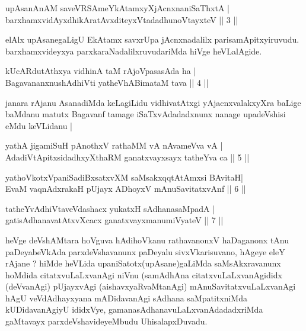 \begin{shl}
upAsanAnAM saveVRSAmeYkAtamxyXjAcnxnaniSaThxtA |\\
barxhamxvidAyxdhikAratAvxditeyxVtadadhunoVtayxteV \hfill || 3 || 
\end{shl}

\begin{artha}
elAlx upAsanegaLigU EkAtamx savxrUpa jAcnxnadalilx parisamApitxyiruvudu. barxhamxvideyxya parxkaraNadalilxruvudariMda hiVge heVLalAgide.
\end{artha}

\begin{shl}
kUcARdutAthxya vidhinA taM rAjoVpasasAda ha |\\
BagavananxnushAdhiVti yatheVhABimataM tava \hfill || 4 || 
\end{shl}

\begin{artha}
janara rAjanu AsanadiMda keLagiLidu vidhivatAtxgi yAjacnxvalakxyXra baLige baMdanu matutx Bagavanf tamage iSaTxvAdadadxnunx nanage upadeVshisi eMdu keVLidanu |
\end{artha}


\begin{shl}
yathA jigamiSuH pAnothxV rathaMM vA nAvameVva vA |\\
AdadiVtA\s \s pitxsidadhxyXthaRM ganatxvayxsayx tatheYva ca \hfill || 5 || 
\end{shl}

\begin{shl}
yathoVkotxVpaniSadiBxsatxvXM saMsakxqqtAtAmx\s si BAvitaH|\\
EvaM vaqnAdxrakaH pUjayx ADhoyxV mAnuSavitatxvAnf \hfill || 6 || 
\end{shl}

\begin{shl}
tatheYvAdhiVtaveVdashacx yukatxH sAdhanasaMpadA |\\
gatisAdhanavatAtxvXcacx ganatxvayxmanumiVyateV \hfill || 7 || 
\end{shl}

\begin{artha}
heVge deVshAMtara hoVguva hAdihoVkanu rathavanonxV haDaganonx tAnu paDeyabeVkAda parxdeVshavanunx paDeyalu sivxVkarisuvano, hAgeye eleY rAjane ? hiMde heVLida upaniSatotx(upAsane)gaLiMda saMsAkxravanunx hoMdida citatxvuLaLxvanAgi niVnu (samAdhAna citatxvuLaLxvanAgididx (deVvanAgi) pUjayxvAgi (aishavxyaRvaMtanAgi) mAnuSavitatxvuLaLxvanAgi hAgU veVdAdhayxyana mADidavanAgi sAdhana saMpatitxniMda kUDidavanAgiyU ididxVye, gamanasAdhanavuLaLxvanAdadadxriMda gaMtavayx parxdeVshavideyeMbudu UhisalapxDuvadu.
\end{artha}

